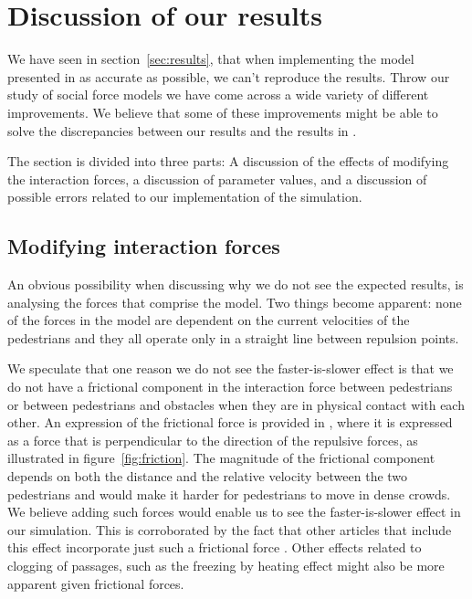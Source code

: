 \section{Discussion of our results}
\label{sec:discussion}
We have seen in section~\ref{sec:results}, that when implementing the model presented in \cite{selv-org} as accurate as possible, we can't reproduce the results. Throw our study of social force models we have come across a wide variety of different improvements. We believe that some of these improvements might be able to solve the discrepancies between our results and the results in \cite{selv-org}.
 
The section is divided into three parts: A discussion of the effects of modifying  
the interaction forces, a discussion of parameter values, and a 
discussion of possible errors related to our implementation of the simulation.

\subsection{Modifying interaction forces}
An obvious possibility when discussing why we do not see the expected results, 
is analysing the forces that comprise the model. Two things become apparent: 
none of the forces in the model are dependent on the current velocities of the 
pedestrians and they all operate only in a straight line between repulsion 
points. 

We speculate that one reason we do not see the faster-is-slower effect is that 
we do not have a frictional component in the interaction force between 
pedestrians or between pedestrians and obstacles when they are in physical 
contact with each other. An expression of the frictional force is provided in 
\cite{helbing00}, where it is expressed as a force that is perpendicular to 
the direction of the repulsive forces, as illustrated in 
figure~\ref{fig:friction}. The magnitude of the frictional component depends 
on both the distance and the relative velocity between the two pedestrians and 
would make it harder for pedestrians to move in dense crowds. We believe 
adding such forces would enable us to see the faster-is-slower effect in our 
simulation. This is corroborated by the fact that other articles that include 
this effect incorporate just such a frictional force \cite{helbing00}.  Other 
effects related to clogging of passages, such as the freezing by heating 
effect might also be more apparent given frictional forces.

